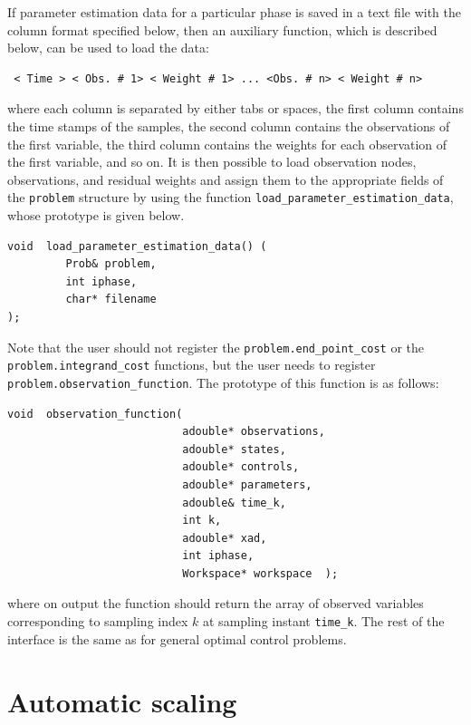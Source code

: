 \documentclass[a4paper,11pt]{report}    %
\begin{document}
If parameter estimation data for a particular phase is saved in a text file with 
the column format specified below, then an auxiliary function, which is described below,
can be used to load the data:
\begin{verbatim}
 < Time > < Obs. # 1> < Weight # 1> ... <Obs. # n> < Weight # n>
\end{verbatim}
where each column is separated by either tabs or spaces, the first column contains the time stamps 
of the samples, the second column contains the observations of the first variable, the third column
contains the weights for each observation of the first variable, and so on. 
It is then possible to load observation nodes, observations, and residual weights and
assign them to the appropriate fields of the \texttt{problem} structure by using the function
\verb|load_parameter_estimation_data|, whose prototype is given below.

\begin{verbatim}
void  load_parameter_estimation_data() (
         Prob& problem,  
         int iphase, 
         char* filename
);
\end{verbatim}



Note that the user should not register the \verb|problem.end_point_cost| or the \verb|problem.integrand_cost| functions,
but the user needs to register \verb|problem.observation_function|. The prototype of this function is
as follows:

\begin{verbatim}
void  observation_function(
                           adouble* observations,  
                           adouble* states, 
                           adouble* controls,
                           adouble* parameters, 
                           adouble& time_k,
                           int k, 
                           adouble* xad, 
                           int iphase,
                           Workspace* workspace  );
\end{verbatim}
where on output the function should return the array of observed variables corresponding to sampling index $k$ 
at sampling instant \verb|time_k|.  The rest of the interface is the same as for general optimal control problems.




\section{Automatic scaling}
\end{document}
